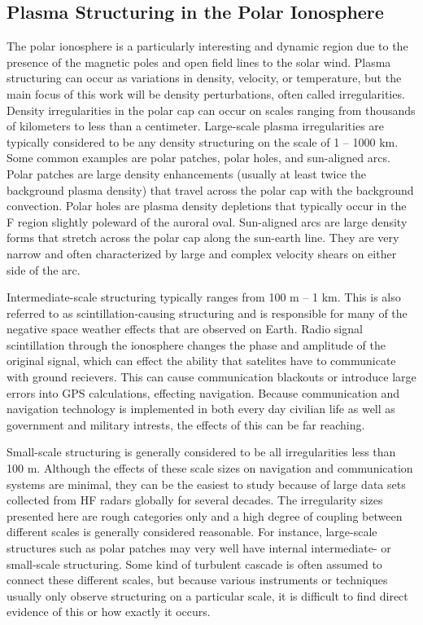 \subsection{Plasma Structuring in the Polar Ionosphere}
\label{sec:polar_structure}
The polar ionosphere is a particularly interesting and dynamic region due to the presence of the magnetic poles and open field lines to the solar wind.  Plasma structuring can occur as variations in density, velocity, or temperature, but the main focus of this work will be density perturbations, often called irregularities.  Density irregularities in the polar cap can occur on scales ranging from thousands of kilometers to less than a centimeter.  Large-scale plasma irregularities are typically considered to be any density structuring on the scale of 1 -- 1000 km.  Some common examples are polar patches, polar holes, and sun-aligned arcs.  Polar patches are large density enhancements (usually at least twice the background plasma density) that travel across the polar cap with the background convection.  Polar holes are plasma density depletions that typically occur in the F region slightly poleward of the auroral oval.  Sun-aligned arcs are large density forms that stretch across the polar cap along the sun-earth line.  They are very narrow and often characterized by large and complex velocity shears on either side of the arc.

Intermediate-scale structuring typically ranges from 100 m -- 1 km.  This is also referred to as scintillation-causing structuring and is responsible for many of the negative space weather effects that are observed on Earth.  Radio signal scintillation through the ionosphere changes the phase and amplitude of the original signal, which can effect the ability that satelites have to communicate with ground recievers.  This can cause communication blackouts or introduce large errors into GPS calculations, effecting navigation.  Because communication and navigation technology is implemented in both every day civilian life as well as government and military intrests, the effects of this can be far reaching.

Small-scale structuring is generally considered to be all irregularities less than 100 m.  Although the effects of these scale sizes on navigation and communication systems are minimal, they can be the easiest to study because of large data sets collected from HF radars globally for several decades.  The irregularity sizes presented here are rough categories only and a high degree of coupling between different scales is generally considered reasonable.  For instance, large-scale structures such as polar patches may very well have internal intermediate- or small-scale structuring.  Some kind of turbulent cascade is often assumed to connect these different scales, but because various instruments or techniques usually only observe structuring on a particular scale, it is difficult to find direct evidence of this or how exactly it occurs.

